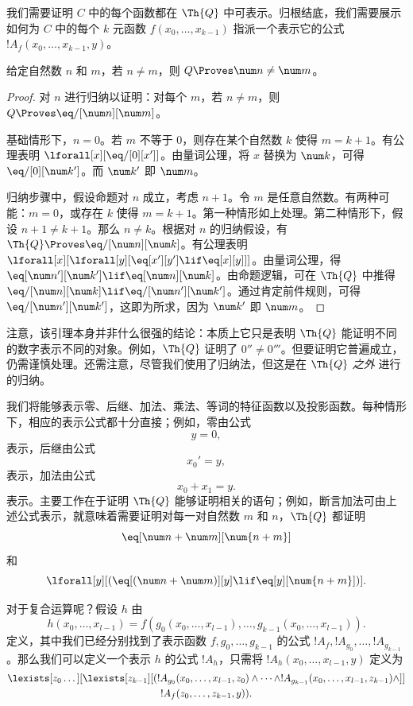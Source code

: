 \documentclass[../../../include/open-logic-section]{subfiles}
\begin{document}

我们需要证明 $C$ 中的每个函数都在 $\Th{Q}$ 中可表示。归根结底，我们需要展示如何为 $C$ 中的每个 $k$ 元函数 $f(x_0,\dots,x_{k-1})$ 指派一个表示它的公式 $!A_f(x_0,\dots,x_{k-1},y)$。

\begin{lem}
给定自然数 $n$ 和 $m$，若 $n \neq m$，则 $Q \Proves \num n \neq \num m$。
\end{lem}

\begin{proof}
对 $n$ 进行归纳以证明：对每个 $m$，若 $n \neq m$，则 $Q \Proves \eq/[\num n][\num m]$。

基础情形下，$n = 0$。若 $m$ 不等于 $0$，则存在某个自然数 $k$ 使得 $m = k + 1$。有公理表明 $\lforall[x][\eq/[0][x']]$。由量词公理，将 $x$ 替换为 $\num k$，可得 $\eq/[0][\num k']$。而 $\num k'$ 即 $\num m$。

归纳步骤中，假设命题对 $n$ 成立，考虑 $n+1$。令 $m$ 是任意自然数。有两种可能：$m = 0$，或存在 $k$ 使得 $m = k+1$。第一种情形如上处理。第二种情形下，假设 $n+1 \neq k+1$。那么 $n \neq k$。根据对 $n$ 的归纳假设，有 $\Th{Q} \Proves \eq/[\num n][\num k]$。有公理表明 $\lforall[x][\lforall[y][\eq[x'][y'] \lif \eq[x][y]]]$。由量词公理，得 $\eq[\num n'][\num k'] \lif \eq[\num n][\num
  k]$。由命题逻辑，可在 $\Th{Q}$ 中推得 $\eq/[\num n][\num k] \lif \eq/[\num n'][\num k']$。通过肯定前件规则，可得 $\eq/[\num n'][\num k']$，这即为所求，因为 $\num k'$ 即 $\num m$。
\end{proof}

注意，该引理本身并非什么很强的结论：本质上它只是表明 $\Th{Q}$ 能证明不同的数字表示不同的对象。例如，$\Th{Q}$ 证明了 $0'' \neq 0'''$。但要证明它普遍成立，仍需谨慎处理。还需注意，尽管我们使用了归纳法，但这是在 $\Th{Q}$ \emph{之外} 进行的归纳。

我们将能够表示零、后继、加法、乘法、等词的特征函数以及投影函数。每种情形下，相应的表示公式都十分直接；例如，零由公式
\[
y = 0,
\]
表示，后继由公式
\[
x_0' = y,
\]
表示，加法由公式
\[
x_0 + x_1 = y.
\]
表示。主要工作在于证明 $\Th{Q}$ 能够证明相关的语句；例如，断言加法可由上述公式表示，就意味着需要证明对每一对自然数 $m$ 和 $n$，$\Th{Q}$ 都证明
\[
\eq[\num n + \num m][\num {n+m}]
\]
和
\[
\lforall[y][(\eq[(\num n + \num m)][y] \lif \eq[y][\num {n+m}])].
\]

对于复合运算呢？假设 $h$ 由
\[
h(x_0,\dots,x_{l-1}) = f(g_0(x_0,\dots,x_{l-1}), \dots,
g_{k-1}(x_0,\dots,x_{l-1})).
\]
定义，其中我们已经分别找到了表示函数 $f,g_0,\dots,g_{k-1}$ 的公式 $!A_f, !A_{g_0}, \dots,
!A_{g_{k-1}}$。那么我们可以定义一个表示 $h$ 的公式 $!A_h$，只需将 $!A_h(x_0,\dots,x_{l-1},y)$ 定义为
\begin{multline*}
  \lexists[z_0\dots][\lexists[z_{k-1}][(!A_{g_0}(x_0,\dots,x_{l-1},z_0) \land
  \dots \land !A_{g_{k-1}}(x_0,\dots,x_{l-1},z_{k-1}) \land]]\\
  !A_f(z_0,\dots,z_{k-1},y)).
\end{multline*}
\end{document}
